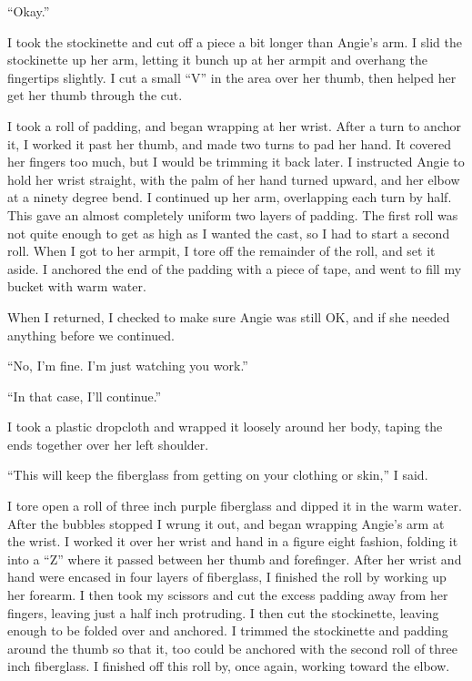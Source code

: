 ``Okay.''

I took the stockinette and cut off a piece a bit longer than Angie's arm. I slid the stockinette
up her arm, letting it bunch up at her armpit and overhang the fingertips slightly. I cut a
small ``V'' in the area over her thumb, then helped her get her thumb through the cut.

I took a roll of padding, and began wrapping at her wrist. After a turn to anchor it, I worked
it past her thumb, and made two turns to pad her hand. It covered her fingers too much, but I
would be trimming it back later. I instructed Angie to hold her wrist straight, with the palm of
her hand turned upward, and her elbow at a ninety degree bend. I continued up her arm,
overlapping each turn by half. This gave an almost completely uniform two layers of padding. The
first roll was not quite enough to get as high as I wanted the cast, so I had to start a second
roll. When I got to her armpit, I tore off the remainder of the roll, and set it aside. I
anchored the end of the padding with a piece of tape, and went to fill my bucket with warm
water.

When I returned, I checked to make sure Angie was still OK, and if she needed anything before we
continued.

``No, I'm fine. I'm just watching you work.''

``In that case, I'll continue.''

I took a plastic dropcloth and wrapped it loosely around her body, taping the ends together over
her left shoulder.

``This will keep the fiberglass from getting on your clothing or skin,'' I said.

I tore open a roll of three inch purple fiberglass and dipped it in the warm water. After the
bubbles stopped I wrung it out, and began wrapping Angie's arm at the wrist. I worked it over
her wrist and hand in a figure eight fashion, folding it into a ``Z'' where it passed between
her thumb and forefinger. After her wrist and hand were encased in four layers of fiberglass, I
finished the roll by working up her forearm. I then took my scissors and cut the excess padding
away from her fingers, leaving just a half inch protruding. I then cut the stockinette, leaving
enough to be folded over and anchored. I trimmed the stockinette and padding around the thumb so
that it, too could be anchored with the second roll of three inch fiberglass. I finished off
this roll by, once again, working toward the elbow.

